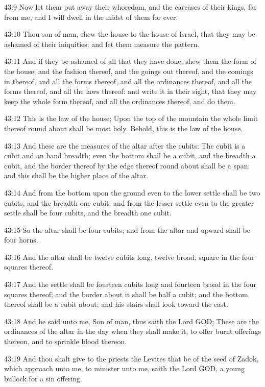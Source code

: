 43:9 Now let them put away their whoredom, and the carcases of their kings, far from me, and I will dwell in the midst of them for ever.

43:10 Thou son of man, shew the house to the house of Israel, that they may be ashamed of their iniquities: and let them measure the pattern.

43:11 And if they be ashamed of all that they have done, shew them the form of the house, and the fashion thereof, and the goings out thereof, and the comings in thereof, and all the forms thereof, and all the ordinances thereof, and all the forms thereof, and all the laws thereof: and write it in their sight, that they may keep the whole form thereof, and all the ordinances thereof, and do them.

43:12 This is the law of the house; Upon the top of the mountain the whole limit thereof round about shall be most holy. Behold, this is the law of the house.

43:13 And these are the measures of the altar after the cubits: The cubit is a cubit and an hand breadth; even the bottom shall be a cubit, and the breadth a cubit, and the border thereof by the edge thereof round about shall be a span: and this shall be the higher place of the altar.

43:14 And from the bottom upon the ground even to the lower settle shall be two cubits, and the breadth one cubit; and from the lesser settle even to the greater settle shall be four cubits, and the breadth one cubit.

43:15 So the altar shall be four cubits; and from the altar and upward shall be four horns.

43:16 And the altar shall be twelve cubits long, twelve broad, square in the four squares thereof.

43:17 And the settle shall be fourteen cubits long and fourteen broad in the four squares thereof; and the border about it shall be half a cubit; and the bottom thereof shall be a cubit about; and his stairs shall look toward the east.

43:18 And he said unto me, Son of man, thus saith the Lord GOD; These are the ordinances of the altar in the day when they shall make it, to offer burnt offerings thereon, and to sprinkle blood thereon.

43:19 And thou shalt give to the priests the Levites that be of the seed of Zadok, which approach unto me, to minister unto me, saith the Lord GOD, a young bullock for a sin offering.

